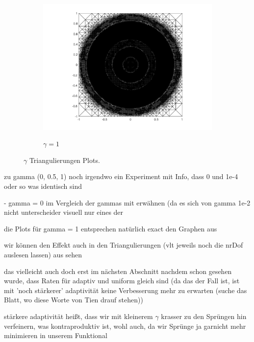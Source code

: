 \begin{figure}[p]
  \begin{subfigure}{.32\linewidth}
    \centering
    \caption{$\gamma=1$}
    \includegraphics[trim = 100 30 80 20, clip, width=\linewidth]
      {pictures/chapExperiments/secExactSol/parGamma/1/lvl14/triangulation.png}
    \label{fig:gammaDot5Triang}
  \end{subfigure}
  \caption{$\gamma$ Triangulierungen Plots.}
  \label{fig:gammaTriangs}
\end{figure}
zu gamma (0, 0.5, 1) noch irgendwo ein Experiment mit Info, dass 0 und 1e-4 oder
so was identisch sind

  - gamma = 0 im Vergleich der gammas mit erwähnen (da es sich von gamma 1e-2
    nicht unterscheider visuell nur eines der

    die Plots für gamma = 1 entsprechen natürlich exact den Graphen aus

    wir können den Effekt auch in den Triangulierungen (vlt jeweils noch die
    nrDof auslesen lassen) aus  sehen

das vielleicht auch doch erst im nächsten Abschnitt nachdem schon gesehen wurde,
dass Raten für adaptiv und uniform gleich sind (da das der Fall ist, ist mit 
'noch stärkerer' adaptivität keine Verbesserung mehr zu erwarten (suche das 
Blatt, wo diese Worte von Tien drauf stehen)) 

stärkere adaptivität heißt, dass wir mit kleinerem $\gamma$ krasser 
zu den Sprüngen hin verfeinern, was kontraproduktiv ist, wohl auch, da wir
Sprünge ja garnicht mehr minimieren in unserem Funktional

